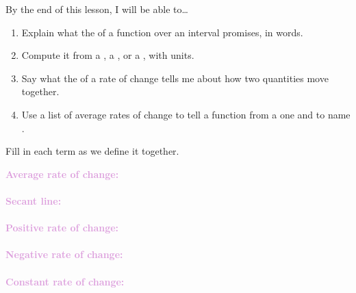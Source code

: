 \documentclass[10pt]{article}
\begin{document}

\vspace{0.12in}

\begin{objectivebox}
By the end of this lesson, I will be able to\ldots
\begin{enumerate}[itemsep=2pt]
  \item Explain what the \blank{4.4cm} of a function over an interval
        promises, in words.
  \item Compute it from a \blank{2.2cm}, a \blank{2.2cm}, or a
        \blank{2.2cm}, with units.
  \item Say what the \blank{1.6cm} of a rate of change tells me about how two
        quantities move together.
  \item Use a list of average rates of change to tell a \blank{2cm} function
        from a \blank{2.4cm} one and to name \blank{2.4cm}.
\end{enumerate}
\end{objectivebox}

\vspace{0.1in}

\boxguard
\begin{vocabbox}
Fill in each term as we define it together.
\par\vspace{2pt}
\noindent\textbf{\textcolor{plum}{Average rate of change:}}\\[1pt]
\writeline\\[3pt]
\noindent\textbf{\textcolor{plum}{Secant line:}}\\[1pt]
\writeline\\[3pt]
\noindent\textbf{\textcolor{plum}{Positive rate of change:}}\\[1pt]
\writeline\\[3pt]
\noindent\textbf{\textcolor{plum}{Negative rate of change:}}\\[1pt]
\writeline\\[3pt]
\noindent\textbf{\textcolor{plum}{Constant rate of change:}}\\[1pt]
\writeline
\end{vocabbox}

\vspace{0.1in}
\end{document}
